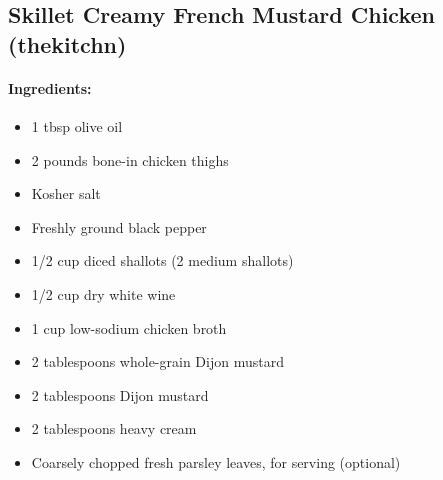 \documentclass{article}
\begin{document}
\subsection{Skillet Creamy French Mustard Chicken (thekitchn)}

\paragraph{Ingredients:}
\begin{itemize}
    \item 1 tbsp olive oil
    \item 2 pounds bone-in chicken thighs
    \item Kosher salt
    \item Freshly ground black pepper
    \item 1/2 cup diced shallots (2 medium shallots)
    \item 1/2 cup dry white wine
    \item 1 cup low-sodium chicken broth
    \item 2 tablespoons whole-grain Dijon mustard
    \item 2 tablespoons Dijon mustard
    \item 2 tablespoons heavy cream
    \item Coarsely chopped fresh parsley leaves, for serving (optional)
\end{itemize}
\end{document}
